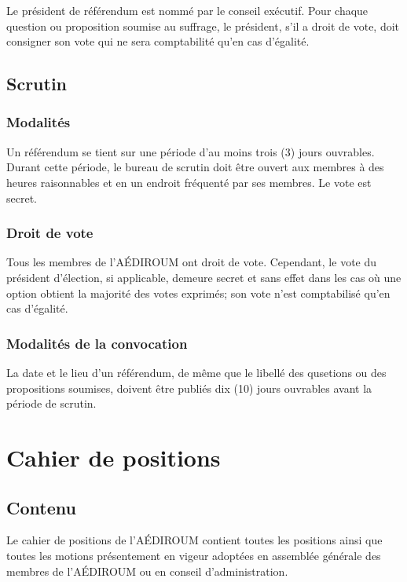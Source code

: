 \documentclass[12pt]{article}
\begin{document}
Le président de référendum est nommé par le conseil exécutif. Pour chaque question ou proposition soumise au suffrage, le président, s'il a droit de vote, doit consigner son vote qui ne sera comptabilité qu'en cas d'égalité.

\subsection{Scrutin}
\subsubsection{Modalités}

Un référendum se tient sur une période d'au moins trois (3) jours ouvrables. Durant cette période, le bureau de scrutin doit être ouvert aux membres à des heures raisonnables et en un endroit fréquenté par ses membres. Le vote est secret.

\subsubsection{Droit de vote}

Tous les membres de l'AÉDIROUM ont droit de vote. Cependant, le vote du président d'élection, si applicable, demeure secret et sans effet dans les cas où une option obtient la majorité des votes exprimés; son vote n'est comptabilisé qu'en cas d'égalité.

\subsubsection{Modalités de la convocation}

La date et le lieu d'un référendum, de même que le libellé des qusetions ou des propositions soumises, doivent être publiés dix (10) jours ouvrables avant la période de scrutin.

\section{Cahier de positions}

\subsection{Contenu}

Le cahier de positions de l’AÉDIROUM contient toutes les positions ainsi que toutes les motions présentement en vigeur adoptées en assemblée générale des membres de l’AÉDIROUM ou en conseil d’administration.
\end{document}
